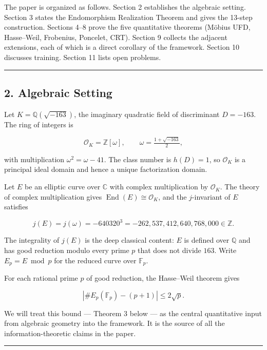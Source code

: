 \documentclass[
  11pt,
]{article}
\begin{document}
The paper is organized as follows. Section 2 establishes the algebraic
setting. Section 3 states the Endomorphism Realization Theorem and gives
the 13-step construction. Sections 4--8 prove the five quantitative
theorems (Möbius UFD, Hasse--Weil, Frobenius, Poncelet, CRT). Section 9
collects the adjacent extensions, each of which is a direct corollary of
the framework. Section 10 discusses training. Section 11 lists open
problems.

\begin{center}\rule{0.5\linewidth}{0.5pt}\end{center}

\hypertarget{algebraic-setting}{%
\subsection{2. Algebraic Setting}\label{algebraic-setting}}

Let \(K = \mathbb{Q}(\sqrt{-163})\), the imaginary quadratic field of
discriminant \(D = -163\). The ring of integers is

\[\mathcal{O}_K = \mathbb{Z}[\omega], \qquad \omega = \tfrac{1 + \sqrt{-163}}{2},\]

with multiplication \(\omega^2 = \omega - 41\). The class number is
\(h(D) = 1\), so \(\mathcal{O}_K\) is a principal ideal domain and hence
a unique factorization domain.

Let \(E\) be an elliptic curve over \(\mathbb{C}\) with complex
multiplication by \(\mathcal{O}_K\). The theory of complex
multiplication gives \(\operatorname{End}(E) \cong \mathcal{O}_K\), and
the \(j\)-invariant of \(E\) satisfies

\[j(E) = j(\omega) = -640320^3 = -262{,}537{,}412{,}640{,}768{,}000 \in \mathbb{Z}.\]

The integrality of \(j(E)\) is the deep classical content: \(E\) is
defined over \(\mathbb{Q}\) and has good reduction modulo every prime
\(p\) that does not divide \(163\). Write \(E_p = E \bmod p\) for the
reduced curve over \(\mathbb{F}_p\).

For each rational prime \(p\) of good reduction, the Hasse--Weil theorem
gives

\[|\#E_p(\mathbb{F}_p) - (p+1)| \leq 2\sqrt{p}.\]

We will treat this bound --- Theorem 3 below --- as the central
quantitative input from algebraic geometry into the framework. It is the
source of all the information-theoretic claims in the paper.

\begin{center}\rule{0.5\linewidth}{0.5pt}\end{center}
\end{document}
